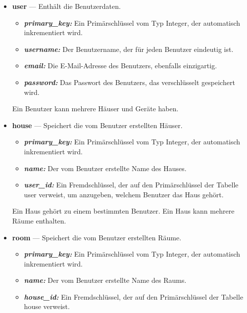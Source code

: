 \documentclass[12pt, letterpaper]{article}
\begin{document}
  \begin{itemize}
    \item \textbf{user} --- Enthält die Benutzerdaten.
                        \begin{itemize}
                          \item \textit{\textbf{primary\_key:}} Ein Primärschlüssel vom Typ Integer, der automatisch inkrementiert wird.
                          \item \textit{\textbf{username:}} Der Benutzername, der für jeden Benutzer eindeutig ist.
                          \item \textit{\textbf{email:}} Die E-Mail-Adresse des Benutzers, ebenfalls einzigartig.
                          \item \textit{\textbf{password:}} Das Passwort des Benutzers, das verschlüsselt gespeichert wird.
                        \end{itemize}
                        Ein Benutzer kann mehrere Häuser und Geräte haben.
    \item \textbf{house} --- Speichert die vom Benutzer erstellten Häuser. 
                        \begin{itemize}
                          \item \textit{\textbf{primary\_key:}} Ein Primärschlüssel vom Typ Integer, der automatisch inkrementiert wird.
                          \item \textit{\textbf{name:}} Der vom Benutzer erstellte Name des Hauses.
                          \item \textit{\textbf{user\_id:}} Ein Fremdschlüssel, der auf den Primärschlüssel der Tabelle user verweist, um anzugeben, welchem Benutzer das Haus gehört.
                        \end{itemize}
                        Ein Haus gehört zu einem bestimmten Benutzer. Ein Haus kann mehrere Räume enthalten.
    \item \textbf{room} --- Speichert die vom Benutzer erstellten Räume. 
                        \begin{itemize}
                          \item \textit{\textbf{primary\_key:}} Ein Primärschlüssel vom Typ Integer, der automatisch inkrementiert wird.
                          \item \textit{\textbf{name:}} Der vom Benutzer erstellte Name des Raums.
                          \item \textit{\textbf{house\_id:}} Ein Fremdschlüssel, der auf den Primärschlüssel der Tabelle house verweist.

\end{itemize}
\end{itemize}
\end{document}
